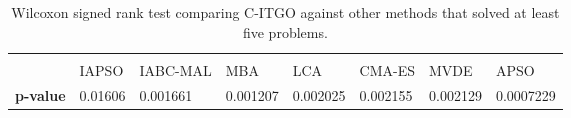\begin{table}[h]
    \tiny
    \begin{center}
    
    \begin{tabular}{ P{1.0cm} P{1.0cm} P{1.2cm} P{1.0cm} P{1.0cm} P{1.0cm} P{1.0cm} P{1.0cm} }
                     &         &          &          &          &         &           &         \\[2em]
                     &  IAPSO  & IABC-MAL &    MBA   &    LCA   & CMA-ES  &   MVDE    & APSO    \\[1em]
    \rule{0pt}{3ex}
    \textbf{p-value} & 0.01606 & 0.001661 & 0.001207 & 0.002025 & 0.002155 & 0.002129 & 0.0007229 \\


    \end{tabular}
    \end{center}
    \vspace*{-4mm}
    \captionsetup{justification=centering}
    \caption{Wilcoxon signed rank test comparing C-ITGO against other methods that solved at least five problems. \\[2em]}
    \label{tab:Wilcoxon}
\end{table}